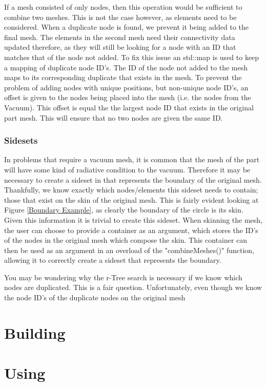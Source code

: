 \documentclass[12pt, letterpaper]{article}
\begin{document}
If a mesh consisted of only nodes, then this operation would be sufficient to combine two meshes. This is not the case however, as elements need to be considered. When a duplicate node is found, we prevent it being added to the final mesh. The elements in the second mesh need their connectivity data updated therefore, as they will still be looking for a node with an ID that matches that of the node not added. To fix this issue an std::map is used to keep a mapping of duplicate node ID's. The ID of the node not added to the mesh maps to its corresponding duplicate that exists in the mesh. To prevent the problem of adding nodes with unique positions, but non-unique node ID's, an offset is given to the nodes being placed into the mesh (i.e. the nodes from the Vacuum). This offset is equal the the largest node ID that exists in the original part mesh. This will ensure that no two nodes are given the same ID.

\subsubsection{Sidesets}
In problems that require a vacuum mesh, it is common that the mesh of the part will have some kind of radiative condition to the vacuum. Therefore it may be necessary to create a sideset in that represents the boundary of the original mesh. Thankfully, we know exactly which nodes/elements this sideset needs to contain; those that exist on the skin of the original mesh. This is fairly evident looking at Figure \ref{Boundary Example}, as clearly the boundary of the circle is its skin. Given this information it is trivial to create this sideset. When skinning the mesh, the user can choose to provide a container as an argument, which stores the ID's of the nodes in the original mesh which compose the skin. This container can then be used as an argument in an overload of the "combineMeshes()" function, allowing it to correctly create a sideset that represents the boundary.

You may be wondering why the r-Tree search is necessary if we know which nodes are duplicated. This is a fair question. Unfortunately, even though we know the node ID's of the duplicate nodes on the original mesh
\section{Building}

\section{Using}
\end{document}

